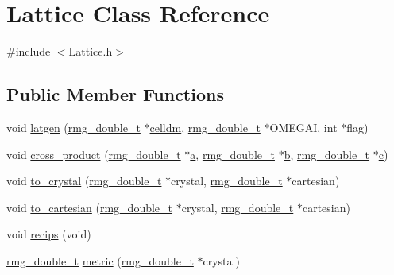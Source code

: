 \hypertarget{class_lattice}{\section{Lattice Class Reference}
\label{class_lattice}
}


{\ttfamily \#include $<$Lattice.\-h$>$}

\subsection*{Public Member Functions}
\begin{DoxyCompactItemize}
\item 
void \hyperlink{class_lattice_afbf3bac52f2bddaef200ce1864f07996}{latgen} (\hyperlink{rmgtypes_8h_aaa16921c14f121c56eaa42390a340db8}{rmg\-\_\-double\-\_\-t} $\ast$\hyperlink{class_lattice_a3543ebf4d6dfd3e7c8b11f6b18783305}{celldm}, \hyperlink{rmgtypes_8h_aaa16921c14f121c56eaa42390a340db8}{rmg\-\_\-double\-\_\-t} $\ast$O\-M\-E\-G\-A\-I, int $\ast$flag)
\item 
void \hyperlink{class_lattice_a40186a336e2a5354eb949e2cae61ffe9}{cross\-\_\-product} (\hyperlink{rmgtypes_8h_aaa16921c14f121c56eaa42390a340db8}{rmg\-\_\-double\-\_\-t} $\ast$\hyperlink{gga__xc__th_8c_abf59cc952e724dd76e644ff9480786d9}{a}, \hyperlink{rmgtypes_8h_aaa16921c14f121c56eaa42390a340db8}{rmg\-\_\-double\-\_\-t} $\ast$\hyperlink{gga__xc__th_8c_a5dd9476685b5767af6e72579b9d3b42e}{b}, \hyperlink{rmgtypes_8h_aaa16921c14f121c56eaa42390a340db8}{rmg\-\_\-double\-\_\-t} $\ast$\hyperlink{lda__c__2d__prm_8c_ae658f8809217a0d2c20837508fe543b9}{c})
\item 
void \hyperlink{class_lattice_a27db7d119e7eba550bf014dc0d0dbd17}{to\-\_\-crystal} (\hyperlink{rmgtypes_8h_aaa16921c14f121c56eaa42390a340db8}{rmg\-\_\-double\-\_\-t} $\ast$crystal, \hyperlink{rmgtypes_8h_aaa16921c14f121c56eaa42390a340db8}{rmg\-\_\-double\-\_\-t} $\ast$cartesian)
\item 
void \hyperlink{class_lattice_a86087a8dfc44ebb41e9e29f449902628}{to\-\_\-cartesian} (\hyperlink{rmgtypes_8h_aaa16921c14f121c56eaa42390a340db8}{rmg\-\_\-double\-\_\-t} $\ast$crystal, \hyperlink{rmgtypes_8h_aaa16921c14f121c56eaa42390a340db8}{rmg\-\_\-double\-\_\-t} $\ast$cartesian)
\item 
void \hyperlink{class_lattice_a6f48aae2ca8288790d50a5818bcdfa8b}{recips} (void)
\item 
\hyperlink{rmgtypes_8h_aaa16921c14f121c56eaa42390a340db8}{rmg\-\_\-double\-\_\-t} \hyperlink{class_lattice_a8e0daa5da995e64be6cdec6e47da8dd3}{metric} (\hyperlink{rmgtypes_8h_aaa16921c14f121c56eaa42390a340db8}{rmg\-\_\-double\-\_\-t} $\ast$crystal)
\end{DoxyCompactItemize}
